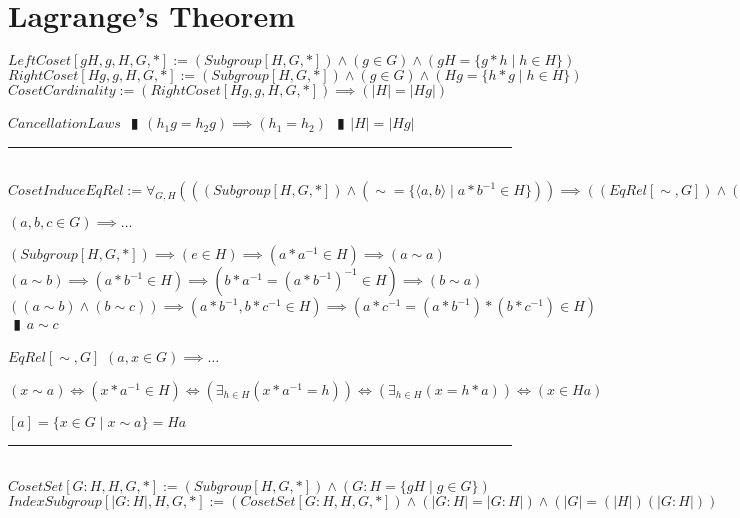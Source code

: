 \documentclass{book}
\newcommand{\abr}{:=}
\newcommand{\pipe}{$\phantom{(}\vrectangleblack\phantom{)}$}
\newcommand{\st}{\mathbin{|}}
\begin{document}
\section{Lagrange's Theorem}
$LeftCoset[g H, g, H, G, *] \abr (Subgroup[H, G, *]) \land (g \in G) \land (g H = \{g * h \st h \in H\})$ \\
$RightCoset[H g, g, H, G, *] \abr (Subgroup[H, G, *]) \land (g \in G) \land (H g = \{h * g \st h \in H\})$ \\

$CosetCardinality \abr (RightCoset[H g, g, H, G, *]) \implies (|H| = |H g|)$
\begin{enumerate}
  \lit $CancellationLaws$ \pipe $(h_1 g = h_2 g) \implies (h_1 = h_2)$ \pipe $|H| = |H g|$
\end{enumerate} \vspace{.75mm} \hrule \vspace{.75mm} \ \\

$CosetInduceEqRel \abr \forall_{G, H}(((Subgroup[H, G, *]) \land (\sim = \{\langle a, b \rangle \st a * b^{-1} \in H\})) \implies ((EqRel[\sim, G]) \land (EqClass[H a, a, \sim, G])))$
\begin{enumerate}
  \lit $(a, b, c \in G) \implies \ldots$
  \begin{enumerate}
    \lit $(Subgroup[H, G, *]) \implies (e \in H) \implies (a * a^{-1} \in H) \implies (a \sim a)$
    \lit $(a \sim b) \implies (a * b^{-1} \in H) \implies (b * a^{-1} = (a * b^{-1})^{-1} \in H) \implies (b \sim a)$
    \lit $((a \sim b) \land (b \sim c)) \implies (a * b^{-1}, b * c^{-1} \in H) \implies (a * c^{-1} = (a * b^{-1}) * (b * c^{-1}) \in H)$ \pipe $a \sim c$
  \end{enumerate}
  \lit $EqRel[\sim, G]$
  \lit $(a, x \in G) \implies \ldots$
  \begin{enumerate}
    \lit $(x \sim a) \iff (x * a^{-1} \in H) \iff (\exists_{h \in H}(x * a^{-1} = h)) \iff (\exists_{h \in H}(x = h * a)) \iff (x \in H a)$
  \end{enumerate}
  \lit $[a] = \{x \in G \st x \sim a\} = H a$
\end{enumerate} \vspace{.75mm} \hrule \vspace{.75mm} \ \\

$CosetSet[G : H, H, G, *] \abr (Subgroup[H, G, *]) \land (G : H = \{g H \st g \in G\})$ \\%
$IndexSubgroup[|G : H|, H, G, *] \abr (CosetSet[G : H, H, G, *]) \land (|G : H| = |G : H|) \land (|G| = (|H|) (|G : H|))$ \\
\end{document}
